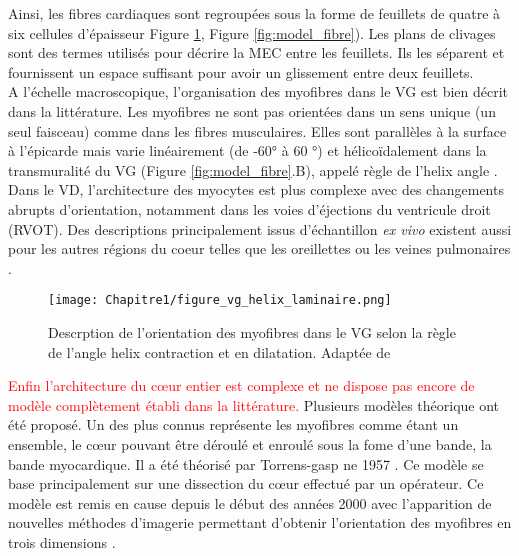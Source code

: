Ainsi, les fibres cardiaques sont regroupées sous la forme de feuillets de quatre à six cellules d’épaisseur 
Figure \ref{fig:model_fibre_HA}, Figure \ref{fig:model_fibre}). Les plans de clivages sont des termes utilisés pour 
décrire la MEC entre les feuillets. Ils les séparent et fournissent un espace suffisant pour avoir un glissement entre deux feuillets.\cite{Wang2019}
\\
A l'échelle macroscopique, l’organisation des myofibres dans le VG est bien décrit dans la littérature.
 Les myofibres ne sont pas orientées dans un sens unique (un seul faisceau) comme dans les fibres musculaires.
  Elles sont parallèles à la surface à l’épicarde mais varie linéairement (de -60° à 60 °) et hélicoïdalement dans la
   transmuralité du VG (Figure \ref{fig:model_fibre}.B), appelé règle de l’helix
    angle \cite{NiellesVallespin2019} \cite{STREETER1969}. Dans le VD, 
    l’architecture des myocytes est plus complexe \cite{Vetter2005} avec des changements abrupts d’orientation,
     notamment dans les voies d’éjections du ventricule droit (RVOT). Des descriptions principalement issus d'échantillon \textit{ex vivo} existent 
     aussi pour les autres régions du coeur telles que les oreillettes \cite{Pashakhanloo2016} ou les veines pulmonaires \cite{Doste2019}. \\
     

\begin{figure}[!h]
  \begin{center}
    \texttt{[image: Chapitre1/figure\_vg\_helix\_laminaire.png]}
  \end{center}
  \caption{Descrption de l'orientation des myofibres dans le VG selon la règle de l'angle helix  contraction et en dilatation. Adaptée de \cite{NiellesVallespin2019}}
  \label{fig:model_fibre_HA}
\end{figure}



\textcolor{red}{Enfin l’architecture du cœur entier est complexe et ne dispose pas encore de modèle complètement établi dans 
la littérature.} Plusieurs modèles théorique ont été proposé. Un des plus connus représente les myofibres comme 
étant un ensemble, le cœur pouvant être déroulé et enroulé sous la fome d’une bande, la bande myocardique. 
Il a été théorisé par Torrens-gasp ne 1957 \cite{Kocica2006}. Ce modèle se base principalement sur une dissection 
du cœur effectué par un opérateur. Ce modèle est remis en cause depuis le début des années 2000 avec l’apparition de
 nouvelles méthodes d’imagerie permettant d’obtenir l’orientation des myofibres en trois dimensions 
 \cite{MacIver2017_end_I} \cite{MacIver2017_end_II}. \\  %

